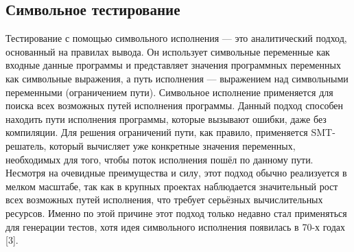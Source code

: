 \subsection{Символьное тестирование}\label{ch2:symbol-test}
Тестирование с помощью символьного исполнения — это аналитический подход, основанный на
правилах вывода. Он использует символьные переменные как входные
данные программы и представляет значения программных переменных
как символьные выражения, а путь исполнения — выражением над символьными переменными (ограничением пути). Символьное исполнение применяется для поиска всех возможных путей исполнения программы. Данный подход способен находить пути исполнения программы, которые вызывают ошибки, даже без компиляции. Для решения
ограничений пути, как правило, применяется SMT-решатель, который
вычисляет уже конкретные значения переменных, необходимых для того, чтобы поток исполнения пошёл по данному пути. Несмотря на очевидные преимущества и силу, этот подход обычно реализуется в мелком масштабе, так как в крупных проектах наблюдается значительный рост всех возможных путей исполнения, что требует серьёзных вычислительных ресурсов. Именно по этой причине этот подход только
недавно стал применяться для генерации тестов, хотя идея символьного
исполнения появилась в 70-х годах [3].
	
